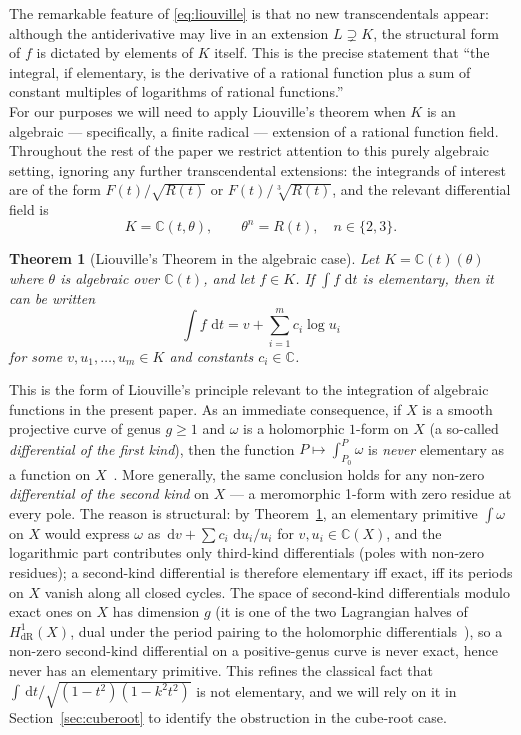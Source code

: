 \documentclass[11pt,a4paper]{article}
\theoremstyle{plain}
\newtheorem{theorem}{Theorem}[section]
\theoremstyle{definition}
\theoremstyle{remark}
\newcommand{\C}{\mathbb{C}}
\renewcommand{\d}{\,\mathrm{d}}
\begin{document}
The remarkable feature of \eqref{eq:liouville} is that no new transcendentals appear: although the antiderivative may live in an extension $L\supsetneq K$, the structural form of $f$ is dictated by elements of $K$ itself. This is the precise statement that ``the integral, if elementary, is the derivative of a rational function plus a sum of constant multiples of logarithms of rational functions.''\\

For our purposes we will need to apply Liouville's theorem when $K$ is an algebraic --- specifically, a finite radical --- extension of a rational function field. Throughout the rest of the paper we restrict attention to this purely algebraic setting, ignoring any further transcendental extensions: the integrands of interest are of the form $F(t)/\sqrt{R(t)}$ or $F(t)/\sqrt[3]{R(t)}$, and the relevant differential field is
\[
  K = \C(t,\theta), \qquad \theta^n = R(t),\quad n\in\{2,3\}.
\]

\begin{theorem}[Liouville's Theorem in the algebraic case]\label{thm:liouville-alg}
Let $K = \C(t)(\theta)$ where $\theta$ is algebraic over $\C(t)$, and let $f\in K$. If $\int f\,\d t$ is elementary, then it can be written
\[
  \int f\,\d t = v + \sum_{i=1}^m c_i \log u_i
\]
for some $v, u_1,\dots,u_m \in K$ and constants $c_i \in \C$.
\end{theorem}

This is the form of Liouville's principle relevant to the integration of algebraic functions in the present paper. As an immediate consequence, if $X$ is a smooth projective curve of genus $g\geq 1$ and $\omega$ is a holomorphic $1$-form on $X$ (a so-called \emph{differential of the first kind}), then the function $P\mapsto \int_{P_0}^P \omega$ is \emph{never} elementary as a function on $X$~\cite{Bronstein2005,Trager1984}. More generally, the same conclusion holds for any non-zero \emph{differential of the second kind} on $X$ --- a meromorphic 1-form with zero residue at every pole. The reason is structural: by Theorem~\ref{thm:liouville-alg}, an elementary primitive $\int\omega$ on $X$ would express $\omega$ as $\d v + \sum c_i\,\d u_i/u_i$ for $v, u_i \in \C(X)$, and the logarithmic part contributes only third-kind differentials (poles with non-zero residues); a second-kind differential is therefore elementary iff exact, iff its periods on $X$ vanish along all closed cycles. The space of second-kind differentials modulo exact ones on $X$ has dimension $g$ (it is one of the two Lagrangian halves of $H^1_{\mathrm{dR}}(X)$, dual under the period pairing to the holomorphic differentials~\cite[Ch.\ 5]{Bronstein2005}), so a non-zero second-kind differential on a positive-genus curve is never exact, hence never has an elementary primitive. This refines the classical fact that $\int \d t/\sqrt{(1-t^2)(1-k^2t^2)}$ is not elementary, and we will rely on it in Section~\ref{sec:cuberoot} to identify the obstruction in the cube-root case.
\end{document}
